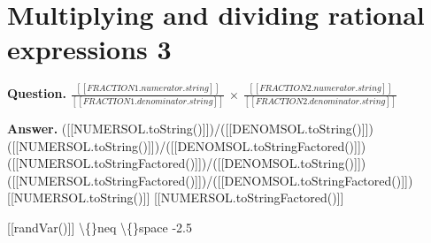 \documentclass{article}
\begin{document}
\section*{Multiplying and dividing rational expressions 3}
\textbf{Question.} $\frac{[[FRACTION1.numerator.string]]}{[[FRACTION1.denominator.string]]}$ $\times$
                    $\frac{[[FRACTION2.numerator.string]]}{[[FRACTION2.denominator.string]]}$

\textbf{Answer.} ([[NUMERSOL.toString()]])/([[DENOMSOL.toString()]])
                ([[NUMERSOL.toString()]])/([[DENOMSOL.toStringFactored()]])
                ([[NUMERSOL.toStringFactored()]])/([[DENOMSOL.toString()]])
                ([[NUMERSOL.toStringFactored()]])/([[DENOMSOL.toStringFactored()]])
                [[NUMERSOL.toString()]]
                [[NUMERSOL.toStringFactored()]]
            
            [[randVar()]] \textbackslash\{\}neq \textbackslash\{\}space
            -2.5
\end{document}
